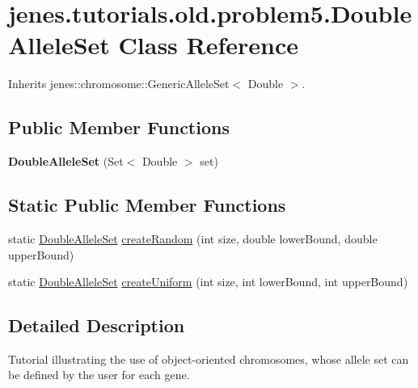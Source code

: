 \hypertarget{classjenes_1_1tutorials_1_1old_1_1problem5_1_1_double_allele_set}{
\section{jenes.tutorials.old.problem5.DoubleAlleleSet Class Reference}
\label{classjenes_1_1tutorials_1_1old_1_1problem5_1_1_double_allele_set}
}
Inherits jenes::chromosome::GenericAlleleSet$<$ Double $>$.

\subsection*{Public Member Functions}
\begin{CompactItemize}
\item 
\hypertarget{classjenes_1_1tutorials_1_1old_1_1problem5_1_1_double_allele_set_16cde300bda10dc1ce20aa354514ad55}{
\textbf{DoubleAlleleSet} (Set$<$ Double $>$ set)}
\label{classjenes_1_1tutorials_1_1old_1_1problem5_1_1_double_allele_set_16cde300bda10dc1ce20aa354514ad55}

\end{CompactItemize}
\subsection*{Static Public Member Functions}
\begin{CompactItemize}
\item 
static \hyperlink{classjenes_1_1tutorials_1_1old_1_1problem5_1_1_double_allele_set}{DoubleAlleleSet} \hyperlink{classjenes_1_1tutorials_1_1old_1_1problem5_1_1_double_allele_set_b055f13f0aade5cd9bf21a42a6c00f67}{createRandom} (int size, double lowerBound, double upperBound)
\item 
static \hyperlink{classjenes_1_1tutorials_1_1old_1_1problem5_1_1_double_allele_set}{DoubleAlleleSet} \hyperlink{classjenes_1_1tutorials_1_1old_1_1problem5_1_1_double_allele_set_f442b73be0657db17a35d7fb376a98ed}{createUniform} (int size, int lowerBound, int upperBound)
\end{CompactItemize}


\subsection{Detailed Description}
Tutorial illustrating the use of object-oriented chromosomes, whose allele set can be defined by the user for each gene.

